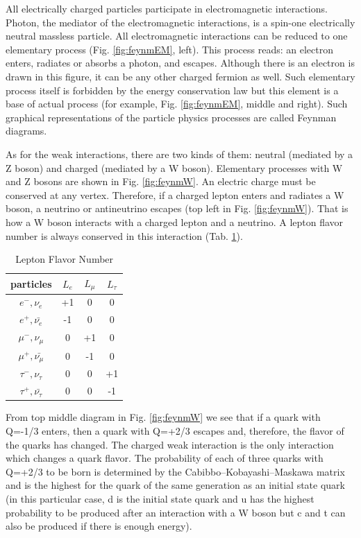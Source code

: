 All electrically charged particles participate in electromagnetic interactions. Photon, the mediator of the electromagnetic interactions, is a spin-one electrically neutral massless particle. All electromagnetic interactions can be reduced to one elementary process (Fig. \ref{fig:feynmEM}, left). This process reads: an electron enters, radiates or absorbs a photon, and escapes. Although there is an electron is drawn in this figure, it can be any other charged fermion as well. Such elementary process itself is forbidden by the energy conservation law but this element is a base of actual process (for example, Fig. \ref{fig:feynmEM}, middle and right). Such graphical representations of the particle physics processes are called Feynman diagrams. 

As for the weak interactions, there are two kinds of them: neutral (mediated by a Z boson) and charged (mediated by a W boson). Elementary processes with W and Z bosons are shown in Fig. \ref{fig:feynmW}. An electric charge must be conserved at any vertex. Therefore, if a charged lepton enters and radiates a W boson, a neutrino or antineutrino escapes (top left in Fig. \ref{fig:feynmW}). That is how a W boson interacts with a charged lepton and a neutrino. A lepton flavor number is always conserved in this interaction (Tab. \ref{tab:LeptonFlavorNumber}). 

 \begin{table}[h]
  \begin{center}
  \caption{ Lepton Flavor Number}
  \begin{tabular}{|c|c|c|c|}
     particles & $L_e$ & $L_{\mu}$ & $L_{\tau}$ \\ \hline
     $e^-,\nu_e$ &  +1  &  0  &  0  \\ \hline 
     $e^+, \bar{\nu_e}$ &  -1  &  0  &  0  \\ \hline 
     $\mu^-,\nu_{\mu}$ &  0  &  +1  &  0  \\ \hline 
     $\mu^+, \bar{\nu_{\mu}}$ &  0  &  -1  &  0  \\ \hline 
     $\tau^-,\nu_{\tau}$ &  0  &  0  &  +1  \\ \hline 
     $\tau^+, \bar{\nu_{\tau}}$ &  0  &  0  &  -1  \\ \hline 
  \end{tabular}
  \label{tab:LeptonFlavorNumber}
  \end{center}
 \end{table}

From top middle diagram in Fig. \ref{fig:feynmW} we see that if a quark with Q=-1/3 enters, then a quark with Q=+2/3 escapes and, therefore, the flavor of the quarks has changed. The charged weak interaction is the only interaction which changes a quark flavor. The probability of each of three quarks with Q=+2/3 to be born is determined by the Cabibbo–Kobayashi–Maskawa matrix and is the highest for the quark of the same generation as an initial state quark (in this particular case, d is the initial state quark and u has the highest probability to be produced after an interaction with a W boson but c and t can also be produced if there is enough energy).

